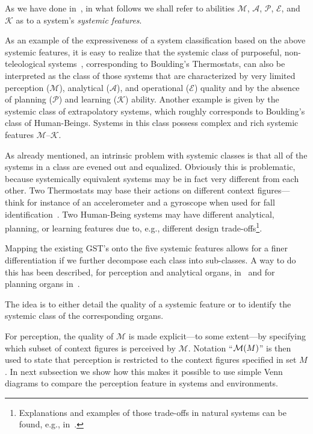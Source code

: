 \documentclass[twocolumn]{svjour3}
\def\M{\hbox{$\mathcal{M}$}}
\def\A{\hbox{$\mathcal{A}$}}
\def\P{\hbox{$\mathcal{P}$}}
\def\E{\hbox{$\mathcal{E}$}}
\def\K{\hbox{$\mathcal{K}$}}
\begin{document}
\begin{definition}
As we have done in~\cite{DF14b}, in what follows we shall refer to abilities \M, \A, \P, \E, and \K{}
as to a system's \emph{systemic features}.
\end{definition}

As an example of the expressiveness of a system classification based
on the above systemic features, it is easy to realize that
the systemic class of purposeful, non-teleological systems~\cite{RWB43},
corresponding to Boulding's Thermostats, can also be interpreted as
the class of those systems that are
characterized by very limited perception (\M), analytical (\A), and operational (\E) quality
and by the absence of planning (\P) and learning (\K) ability.
Another example is given by the systemic class of extrapolatory systems, which
roughly corresponds to Boulding's class of Human-Beings. Systems in this class
possess complex and rich systemic features \M--\K.

As already mentioned, an intrinsic problem with systemic classes is that all of the systems
in a class are evened out and equalized. Obviously this is problematic, because systemically equivalent systems
may be in fact very different from each other. Two Thermostats may base their actions
on different context figures---think for instance of an accelerometer and a gyroscope
when used for fall identification~\cite{DBLP:journals/corr/FlorioP15b,EDC2013}.
Two Human-Being systems may have different analytical, planning, or learning features
due to, e.g., different design trade-offs\footnote{Explanations and examples
	of those trade-offs in natural systems can be found,
	e.g., in~\cite{Nilsson08,Nilsson08b,WeWi55,Nilsson14}.}.

Mapping the existing GST's onto the five systemic features allows
for a finer differentiation if we further decompose each class into sub-classes.
A way to do this has been described, for perception and analytical organs,
in~\cite{DF12a} and for planning organs in~\cite{DF13b}.

The idea is to either detail the quality of a systemic feature or to identify
the systemic class of the corresponding organs.

For perception, the quality of \M{} is made explicit---to some extent---by specifying which
subset of context figures is perceived by \M. Notation ``$\M(M)$'' is then used
to state that perception is restricted to the context figures
specified in set $M$.
In next subsection we show how this makes it possible to use simple Venn diagrams to compare the perception feature
in systems and environments.
\end{document}
